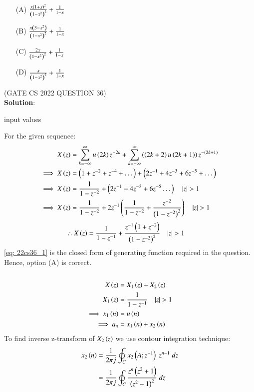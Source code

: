 \documentclass[journal,12pt,twocolumn]{IEEEtran}
\theoremstyle{remark}
\begin{document}
\begin{enumerate}
    \item[(A)] $ \frac{x\left(1+x\right)^2}{\left(1-x^2\right)^2} + \frac{1}{1-x}$
    \item[(B)]$ \frac{x\left(3-x^2\right)}{\left(1-x^2\right)^2} + \frac{1}{1-x}$
    \item[(C)] $ \frac{2x}{\left(1-x^2\right)^2} + \frac{1}{1-x}$
    \item[(D)] $ \frac{x}{\left(1-x^2\right)^2} + \frac{1}{1-x}$  
\end{enumerate}
\hfill(GATE CS 2022 QUESTION 36)\\
\textbf{Solution}:\\
\begin{table}[h!] 
\centering

\caption{input values}
\label{tab: Table2022cs36}
\end{table}
For the given sequence:
\begin{align}
X\brak{z} &= \sum_{k=-\infty}^{\infty} u\brak{2k} z^{-2k}+ \sum_{k=-\infty}^{\infty} \brak{\brak{2k+2}u\brak{2k+1}} z^{-\brak{2k+1}}\\
\implies X\brak{z} &= \brak{1+z^{-2}+z^{-4} + \dots} + \brak{2z^{-1}+4z^{-3} + 6z^{-5} + \dots}\\
\implies X\brak{z} &= \frac{1}{1-z^{-2}} + \brak{2z^{-1}+4z^{-3}+6z^{-5} \dots} \quad |z|>1\\
\implies X\brak{z} &= \frac{1}{1-z^{-2}} +2z^{-1}\brak{\frac{1}{1-z^{-2}}+\frac{z^{-2}}{\brak{1-z^{-2}}^2}} \quad |z|>1
\end{align}
\begin{align}
\therefore X\brak{z} &= \frac{1}{1-z^{-1}} + \frac{z^{-1}\brak{1+z^{-2}}}{\brak{1-z^{-2}}^2} \quad |z|>1 \label{eq: 22cs36_1}
\end{align}
\eqref{eq: 22cs36_1} is the closed form of generating function required in the question.\\
Hence, option (A) is correct.\\\\
\begin{align}
X\brak{z}&=X_1\brak{z}+X_2\brak{z}\\
X_1\brak{z}&=\frac{1}{1-z^{-1}} \quad |z|>1\\ 
\implies x_1\brak{n} &= u\brak{n}\\
\implies a_n&=  x_1\brak{n}+ x_2\brak{n}
\end{align}
To find inverse z-transform of $ X_2\left(z\right)$ we use contour integration technique:
\begin{align}
    x_2\left(n\right)&=\frac{1}{2\pi j}\oint_{C}x_2\left(A;z^{-1}\right) \;z^{n-1} \;dz  \\
    &=\frac{1}{2\pi j}\oint_{C}\frac{z^{n}\left(z^2+1\right)}{\left(z^2-1\right)^2} \;dz 
\end{align}
\end{document}
